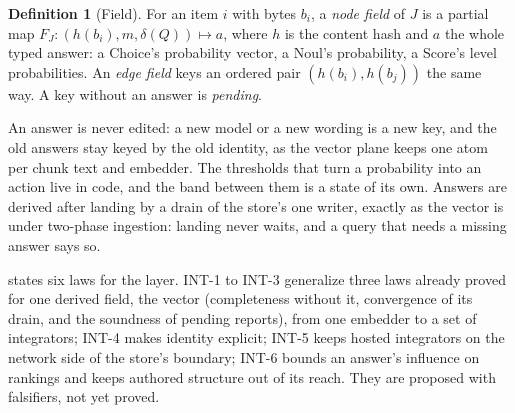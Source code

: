 \documentclass[11pt]{article}
\theoremstyle{definition}
\newtheorem{definition}{Definition}
\theoremstyle{plain}
\theoremstyle{remark}
\begin{document}
\begin{definition}[Field]
For an item $i$ with bytes $b_i$, a \emph{node field} of $J$ is a partial map
$F_J : (h(b_i), m, \delta(Q)) \mapsto a$, where $h$ is the content hash and $a$ the whole typed
answer: a Choice's probability vector, a Noul's probability, a Score's level probabilities. An
\emph{edge field} keys an ordered pair $(h(b_i), h(b_j))$ the same way. A key without an answer is
\emph{pending}.
\end{definition}

An answer is never edited: a new model or a new wording is a new key, and the old answers stay
keyed by the old identity, as the vector plane keeps one atom per chunk text and embedder. The
thresholds that turn a probability into an action live in code, and the band between them is a
state of its own. Answers are derived after landing by a drain of the store's one writer, exactly
as the vector is under two-phase ingestion: landing never waits, and a query that needs a missing
answer says so.

 states six laws for the layer. INT-1 to INT-3 generalize three laws already
proved for one derived field, the vector (completeness without it, convergence of its drain, and
the soundness of pending reports), from one embedder to a set of integrators; INT-4 makes identity
explicit; INT-5 keeps hosted integrators on the network side of the store's boundary; INT-6 bounds
an answer's influence on rankings and keeps authored structure out of its reach. They are proposed
with falsifiers, not yet proved.
\end{document}
